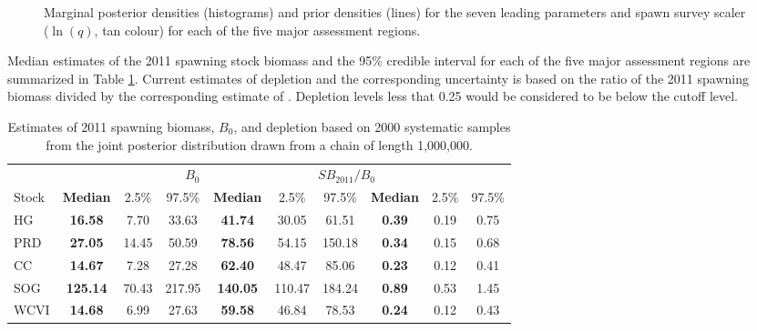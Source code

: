 \begin{figure}[!tbp]

	\caption{Marginal posterior densities (histograms) and prior densities (lines) for the seven leading parameters and spawn survey scaler ($\ln(q)$, tan colour) for each of the five major assessment regions.}\label{PartII:MCMC:Marginals}
\end{figure}

Median estimates of the 2011 spawning stock biomass and the 95\% credible interval for each of the five major assessment regions are summarized in Table \ref{table:2011_SB_Depletion}.  Current estimates of depletion and the corresponding uncertainty is based on the ratio of the 2011 spawning biomass divided by the corresponding estimate of \bo.  Depletion levels less that 0.25 would be considered to be below the cutoff level.

\begin{table}
	\caption{Estimates of 2011 spawning biomass, $B_0$, and depletion based on 2000 systematic samples from the joint posterior distribution drawn from a chain of length 1,000,000.\label{table:2011_SB_Depletion}}
	\begin{center}
	\begin{small}
	\begin{tabular}{l>{\bfseries}ccc|>{\bfseries}ccc|>{\bfseries}ccc}
	\hline 
	&\multicolumn{3}{c}{$SB_{2011}$} 
	&\multicolumn{3}{c}{$B_0$} 
	&\multicolumn{3}{c}{$SB_{2011}/B_0$}\\
	Stock 
	&Median & 2.5\% & 97.5\%
	&Median & 2.5\% & 97.5\%
	&Median & 2.5\% & 97.5\% \\
	\hline
	HG & 16.58 & 7.70 &33.63& 41.74 &30.05 &61.51&  0.39  &0.19  &0.75 \\
	PRD & 27.05 & 14.45&  50.59 & 78.56 & 54.15 &150.18 &  0.34  & 0.15  & 0.68\\
	CC & 14.67 & 7.28 &27.28 &62.40& 48.47& 85.06 & 0.23 & 0.12 & 0.41\\
	SOG & 125.14 & 70.43& 217.95 &140.05& 110.47& 184.24 &  0.89 &  0.53 &  1.45\\
	WCVI & 14.68 & 6.99 &27.63& 59.58& 46.84& 78.53&  0.24 & 0.12&  0.43\\
	\hline
	\end{tabular}
	\end{small}
	\end{center}
\end{table}


